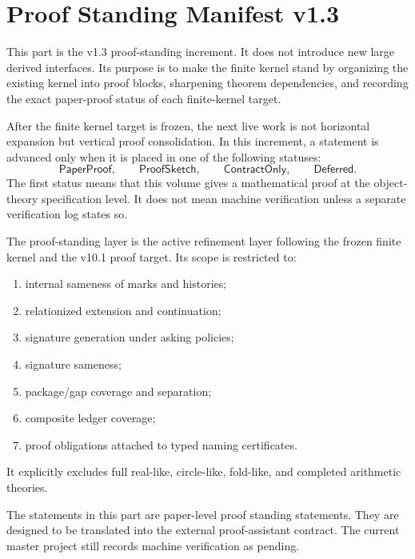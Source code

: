 
\chapter{Proof Standing Manifest v1.3}

This part is the v1.3 proof-standing increment. It does not introduce new large derived interfaces. Its purpose is to make the finite kernel stand by organizing the existing kernel into proof blocks, sharpening theorem dependencies, and recording the exact paper-proof status of each finite-kernel target.

\begin{principle}
After the finite kernel target is frozen, the next live work is not horizontal expansion but vertical proof consolidation. In this increment, a statement is advanced only when it is placed in one of the following statuses:
\[
\mathsf{PaperProof},\qquad \mathsf{ProofSketch},\qquad \mathsf{ContractOnly},\qquad \mathsf{Deferred}.
\]
The first status means that this volume gives a mathematical proof at the object-theory specification level. It does not mean machine verification unless a separate verification log states so.
\end{principle}

\begin{definition}
The proof-standing layer is the active refinement layer following the frozen finite kernel and the v10.1 proof target. Its scope is restricted to:
\begin{enumerate}
  \item internal sameness of marks and histories;
  \item relationized extension and continuation;
  \item signature generation under asking policies;
  \item signature sameness;
  \item package/gap coverage and separation;
  \item composite ledger coverage;
  \item proof obligations attached to typed naming certificates.
\end{enumerate}
It explicitly excludes full real-like, circle-like, fold-like, and completed arithmetic theories.
\end{definition}

\begin{remark}
The statements in this part are paper-level proof standing statements. They are designed to be translated into the external proof-assistant contract. The current master project still records machine verification as pending.
\end{remark}

